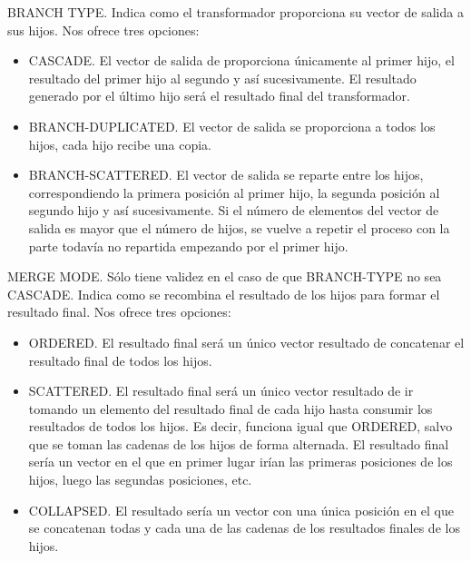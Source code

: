 \begin{description}
  \item{BRANCH TYPE.} Indica como el transformador proporciona su
    vector de salida a sus hijos. Nos ofrece tres opciones:
    \begin{itemize}
      \item CASCADE. El vector de salida de proporciona únicamente al
        primer hijo, el resultado del primer hijo al segundo y así
        sucesivamente. El resultado generado por el último hijo será
        el resultado final del transformador.
      \item BRANCH-DUPLICATED. El vector de salida se proporciona a
        todos los hijos, cada hijo recibe una copia.
      \item BRANCH-SCATTERED. El vector de salida se reparte entre los
        hijos, correspondiendo la primera posición al primer hijo, la
        segunda posición al segundo hijo y así sucesivamente. Si el
        número de elementos del vector de salida es mayor que el
        número de hijos, se vuelve a repetir el proceso con la parte
        todavía no repartida empezando por el primer hijo.
    \end{itemize}
  \item{MERGE MODE.} Sólo tiene validez en el caso de que
    BRANCH-TYPE no sea CASCADE. Indica como se recombina el resultado
    de los hijos para formar el resultado final. Nos ofrece tres
    opciones:
    \begin{itemize}
      \item ORDERED. El resultado final será un único vector resultado
        de concatenar el resultado final de todos los hijos.
      \item SCATTERED. El resultado final será un único vector
        resultado de ir tomando un elemento del resultado final de
        cada hijo hasta consumir los resultados de todos los hijos. Es
        decir, funciona igual que ORDERED, salvo que se toman las
        cadenas de los hijos de forma alternada. El resultado final
        sería un vector en el que en primer lugar irían las primeras
        posiciones de los hijos, luego las segundas posiciones, etc.
      \item COLLAPSED. El resultado sería un vector con una única
        posición en el que se concatenan todas y cada una de las
        cadenas de los resultados finales de los hijos.
    \end{itemize}
\end{description}

